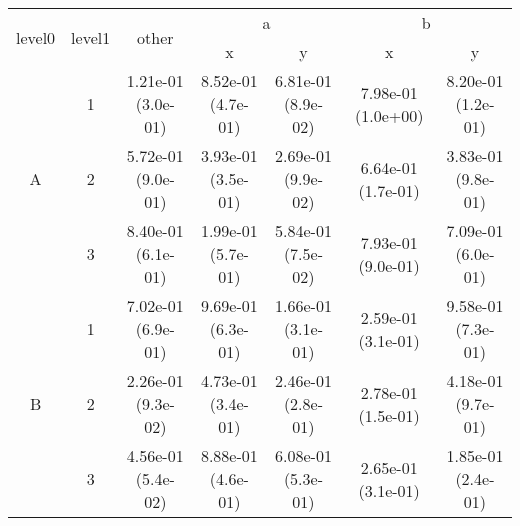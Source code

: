 \begin{tabular}{ccccccc}
\toprule
\multirow{2}{*}{level0} & \multirow{2}{*}{level1}& \multirow{2}{*}{other}&\multicolumn{2}{c}{a}&\multicolumn{2}{c}{b}\tabularnewline
\cmidrule(lr){4-5}
\cmidrule(lr){6-7}
&&&x&y&x&y\tabularnewline
\midrule
\multirow{3}{*}{A}&1& 1.21e-01 (3.0e-01)& 8.52e-01 (4.7e-01)& 6.81e-01 (8.9e-02)& 7.98e-01 (1.0e+00)& 8.20e-01 (1.2e-01)\tabularnewline
&2& 5.72e-01 (9.0e-01)& 3.93e-01 (3.5e-01)& 2.69e-01 (9.9e-02)& 6.64e-01 (1.7e-01)& 3.83e-01 (9.8e-01)\tabularnewline
&3& 8.40e-01 (6.1e-01)& 1.99e-01 (5.7e-01)& 5.84e-01 (7.5e-02)& 7.93e-01 (9.0e-01)& 7.09e-01 (6.0e-01)\tabularnewline
\midrule
\multirow{3}{*}{B}&1& 7.02e-01 (6.9e-01)& 9.69e-01 (6.3e-01)& 1.66e-01 (3.1e-01)& 2.59e-01 (3.1e-01)& 9.58e-01 (7.3e-01)\tabularnewline
&2& 2.26e-01 (9.3e-02)& 4.73e-01 (3.4e-01)& 2.46e-01 (2.8e-01)& 2.78e-01 (1.5e-01)& 4.18e-01 (9.7e-01)\tabularnewline
&3& 4.56e-01 (5.4e-02)& 8.88e-01 (4.6e-01)& 6.08e-01 (5.3e-01)& 2.65e-01 (3.1e-01)& 1.85e-01 (2.4e-01)\tabularnewline
\bottomrule
\end{tabular}
